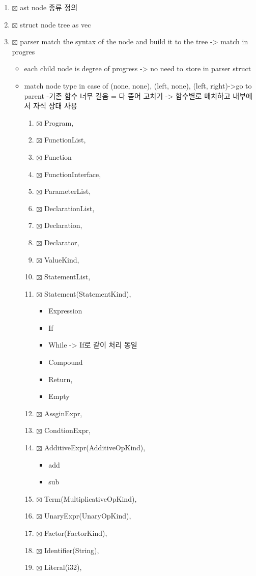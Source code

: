 \documentclass[11pt]{article}
\begin{document}
\begin{enumerate}
\item{$\boxtimes$} ast node 종류 정의
\item{$\boxtimes$} struct node tree as vec
\item{$\boxtimes$} parser match the syntax of the node and build it to the tree -> match in progres
\begin{itemize}
\item[{$\boxtimes$}] each child node is degree of progress -> no need to store in parser struct
\item[{$\boxtimes$}] match node type in case of (none, none), (left, none), (left, right)->go to parent
-기존 함수 너무 길음 = 다 뜯어 고치기 -> 함수별로 매치하고 내부에서 자식 상태 사용
\begin{enumerate}
\item{$\boxtimes$} Program,
\item{$\boxtimes$} FunctionList,
\item{$\boxtimes$} Function
\item{$\boxtimes$} FunctionInterface,
\item{$\boxtimes$} ParameterList,
\item{$\boxtimes$} DeclarationList,
\item{$\boxtimes$} Declaration,
\item{$\boxtimes$} Declarator,
\item{$\boxtimes$} ValueKind,
\item{$\boxtimes$} StatementList,
\item{$\boxtimes$} Statement(StatementKind),
\begin{itemize}
\item[{$\boxtimes$}] Expression
\item[{$\boxtimes$}] If
\item[{$\boxtimes$}] While -> If로 같이 처리 동일
\item[{$\boxtimes$}] Compound
\item[{$\boxtimes$}] Return,
\item[{$\boxtimes$}] Empty
\end{itemize}
\item{$\boxtimes$} AssginExpr,
\item{$\boxtimes$} CondtionExpr,
\item{$\boxtimes$} AdditiveExpr(AdditiveOpKind),
\begin{itemize}
\item[{$\boxtimes$}] add
\item[{$\boxtimes$}] sub
\end{itemize}
\item{$\boxtimes$} Term(MultiplicativeOpKind),
\item{$\boxtimes$} UnaryExpr(UnaryOpKind),
\item{$\boxtimes$} Factor(FactorKind),
\item{$\boxtimes$} Identifier(String),
\item{$\boxtimes$} Literal(i32),
\end{enumerate}
\end{itemize}
\end{enumerate}
\end{document}
